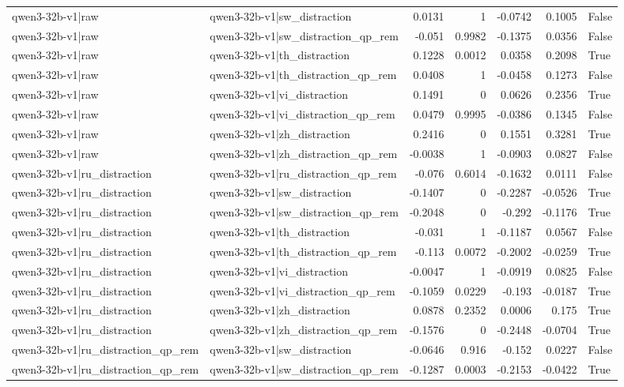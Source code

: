 \begin{table}
\begin{tabular}{l l r r r r l}
qwen3-32b-v1|raw & qwen3-32b-v1|sw_distraction & 0.0131 & 1 & -0.0742 & 0.1005 & False \\
qwen3-32b-v1|raw & qwen3-32b-v1|sw_distraction_qp_rem & -0.051 & 0.9982 & -0.1375 & 0.0356 & False \\
qwen3-32b-v1|raw & qwen3-32b-v1|th_distraction & 0.1228 & 0.0012 & 0.0358 & 0.2098 & True \\
qwen3-32b-v1|raw & qwen3-32b-v1|th_distraction_qp_rem & 0.0408 & 1 & -0.0458 & 0.1273 & False \\
qwen3-32b-v1|raw & qwen3-32b-v1|vi_distraction & 0.1491 & 0 & 0.0626 & 0.2356 & True \\
qwen3-32b-v1|raw & qwen3-32b-v1|vi_distraction_qp_rem & 0.0479 & 0.9995 & -0.0386 & 0.1345 & False \\
qwen3-32b-v1|raw & qwen3-32b-v1|zh_distraction & 0.2416 & 0 & 0.1551 & 0.3281 & True \\
qwen3-32b-v1|raw & qwen3-32b-v1|zh_distraction_qp_rem & -0.0038 & 1 & -0.0903 & 0.0827 & False \\
qwen3-32b-v1|ru_distraction & qwen3-32b-v1|ru_distraction_qp_rem & -0.076 & 0.6014 & -0.1632 & 0.0111 & False \\
qwen3-32b-v1|ru_distraction & qwen3-32b-v1|sw_distraction & -0.1407 & 0 & -0.2287 & -0.0526 & True \\
qwen3-32b-v1|ru_distraction & qwen3-32b-v1|sw_distraction_qp_rem & -0.2048 & 0 & -0.292 & -0.1176 & True \\
qwen3-32b-v1|ru_distraction & qwen3-32b-v1|th_distraction & -0.031 & 1 & -0.1187 & 0.0567 & False \\
qwen3-32b-v1|ru_distraction & qwen3-32b-v1|th_distraction_qp_rem & -0.113 & 0.0072 & -0.2002 & -0.0259 & True \\
qwen3-32b-v1|ru_distraction & qwen3-32b-v1|vi_distraction & -0.0047 & 1 & -0.0919 & 0.0825 & False \\
qwen3-32b-v1|ru_distraction & qwen3-32b-v1|vi_distraction_qp_rem & -0.1059 & 0.0229 & -0.193 & -0.0187 & True \\
qwen3-32b-v1|ru_distraction & qwen3-32b-v1|zh_distraction & 0.0878 & 0.2352 & 0.0006 & 0.175 & True \\
qwen3-32b-v1|ru_distraction & qwen3-32b-v1|zh_distraction_qp_rem & -0.1576 & 0 & -0.2448 & -0.0704 & True \\
qwen3-32b-v1|ru_distraction_qp_rem & qwen3-32b-v1|sw_distraction & -0.0646 & 0.916 & -0.152 & 0.0227 & False \\
qwen3-32b-v1|ru_distraction_qp_rem & qwen3-32b-v1|sw_distraction_qp_rem & -0.1287 & 0.0003 & -0.2153 & -0.0422 & True \\

\end{tabular}
\end{table}

